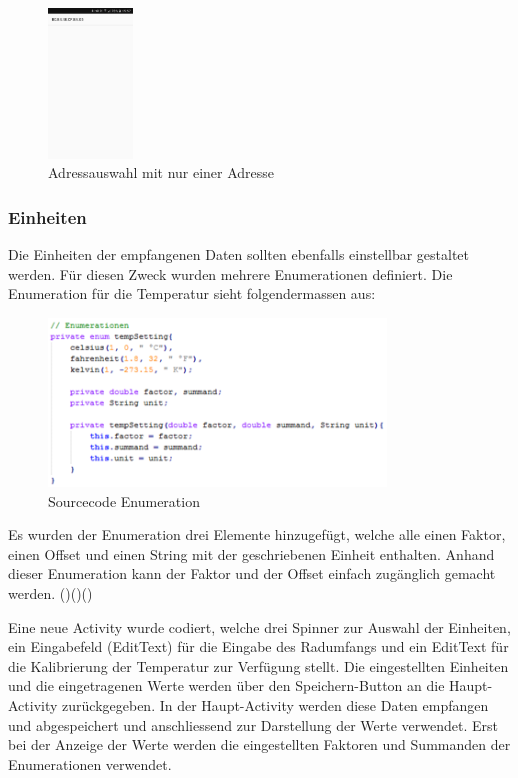 \begin{figure}[ht]
    \includegraphics[width=0.2\textwidth]{3Vorgehen/imag/BLEAdresseAuswaehlen.png}
    \caption{Adressauswahl mit nur einer Adresse}
	\label{BLEadressauswahl} 
\end{figure}



\subsubsection{Einheiten}

Die Einheiten der empfangenen Daten sollten ebenfalls einstellbar gestaltet werden. Für diesen Zweck wurden mehrere Enumerationen definiert. Die Enumeration für die Temperatur sieht folgendermassen aus:

\begin{figure}[ht]
    \includegraphics[width=0.8\textwidth]{3Vorgehen/imag/app_tempSetting.png}
    \caption{Sourcecode Enumeration}
	\label{app_tempSetting} 
\end{figure}

Es wurden der Enumeration drei Elemente hinzugefügt, welche alle einen Faktor, einen Offset und einen String mit der geschriebenen Einheit enthalten. Anhand dieser Enumeration kann der Faktor und der Offset einfach zugänglich gemacht werden. (\cite{calcTemp})(\cite{calcPressure})(\cite{calcVelocity}) 

Eine neue Activity wurde codiert, welche drei Spinner zur Auswahl der Einheiten, ein Eingabefeld (EditText) für die Eingabe des Radumfangs und ein EditText für die Kalibrierung der Temperatur zur Verfügung stellt. Die eingestellten Einheiten und die eingetragenen Werte werden über den Speichern-Button an die Haupt-Activity zurückgegeben. In der Haupt-Activity werden diese Daten empfangen und abgespeichert und anschliessend zur Darstellung der Werte verwendet. Erst bei der Anzeige der Werte werden die eingestellten Faktoren und Summanden der Enumerationen verwendet.

